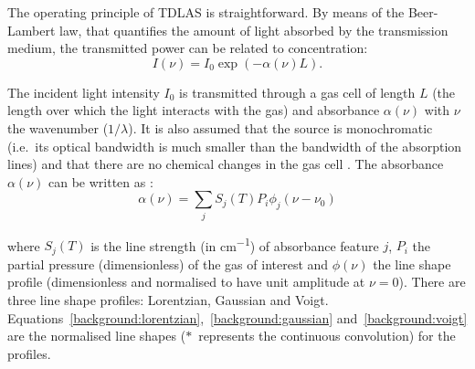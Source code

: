 \documentclass[\home/main.tex]{subfiles}
\begin{document}
  The operating principle of \acrshort{TDLAS} is straightforward. By means of the Beer-Lambert law, that quantifies the amount of light absorbed by the transmission medium, the transmitted power can be related to concentration:
  \begin{equation}
    I(\nu) = I_0 \exp(-\alpha(\nu)L)\text{.}
    \label{background:Beer-Lambert-law}
  \end{equation}

  The incident light intensity $I_0$ is transmitted through a gas cell of length $L$ (the length over which the light interacts with the gas) and absorbance $\alpha(\nu)$ with $\nu$ the wavenumber ($1/\lambda$). It is also assumed that the source is monochromatic (i.e.\ its optical bandwidth is much smaller than the bandwidth of the absorption lines) and that there are no chemical changes in the gas cell \cite{abs-spec-status-and-potential}. The absorbance $\alpha(\nu)$ can be written as \cite{RiekerDissertation}:%
  \begin{equation}
    \alpha(\nu) = \sum_j S_j(T) P_i \phi_j(\nu-\nu_0)
    \label{background:absorption-coefficient}
  \end{equation}

  where $S_j(T)$ is the line strength (in \si{\centi\metre^{-1}}) of absorbance feature $j$, $P_i$ the partial pressure (dimensionless) of the gas of interest and $\phi(\nu)$ the line shape profile (dimensionless and normalised to have unit amplitude at $\nu=0$). There are three line shape profiles: Lorentzian, Gaussian and Voigt. Equations~\ref{background:lorentzian},~\ref{background:gaussian} and~\ref{background:voigt}
  are the normalised line shapes ($*$~represents the continuous convolution) for the profiles.
    
   
\end{document}
